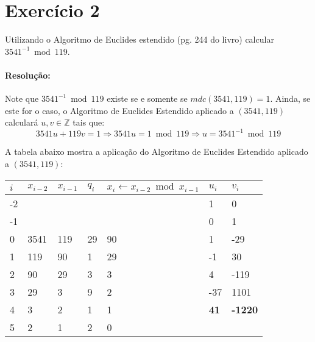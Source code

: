 \documentclass[a4paper,11pt]{article} %
\begin{document}
\section{Exercício 2}
\mbox{}

Utilizando o Algoritmo de Euclides estendido (pg. 244 do livro) calcular $ 3541^{-1} \bmod 119 $.

\paragraph{Resolução:}
Note que $ 3541^{-1} \bmod 119 $ existe se e somente se $ mdc(3541, 119) = 1 $. Ainda, se este for o caso, o Algoritmo de Euclides Estendido aplicado a $ (3541, 119) $ calculará $ u, v \in \mathbb{Z} $ tais que:
$$ 3541u + 119v = 1 \Rightarrow 3541u = 1 \bmod 119 \Rightarrow u = 3541^{-1} \bmod 119 $$

A tabela abaixo mostra a aplicação do Algoritmo de Euclides Estendido aplicado a $ (3541, 119) $:
\begin{table}[h]
\begin{tabular}{|l|l|l|l|l|l|l|}
\hline
\textbf{$ i $} & \textbf{$ x_{i-2} $} & \textbf{$ x_{i-1} $} & \textbf{$ q_i $} & \textbf{$ x_i \leftarrow x_{i-2} \bmod x_{i-1} $} & \textbf{$ u_{i} $} & \textbf{$ v_i $} \\ \hline
-2             &                      &                      &                  &                                                   & 1                  & 0                \\ \hline
-1             &                      &                      &                  &                                                   & 0                  & 1                \\ \hline
0              & 3541                 & 119                  & 29               & 90                                                & 1                  & -29              \\ \hline
1              & 119                  & 90                   & 1                & 29                                                & -1                 & 30               \\ \hline
2              & 90                   & 29                   & 3                & 3                                                 & 4                  & -119             \\ \hline
3              & 29                   & 3                    & 9                & 2                                                 & -37                & 1101             \\ \hline
4              & 3                    & 2                    & 1                & 1                                                 & \textbf{41}        & \textbf{-1220}   \\ \hline
5              & 2                    & 1                    & 2                & 0                                                 &                    &                  \\ \hline
\end{tabular}
\end{table}
\end{document}
